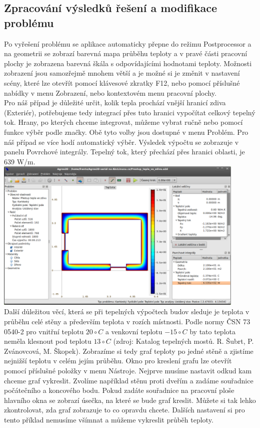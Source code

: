 \documentclass[a4paper, oneside]{article}
\begin{document}
\subsection{Zpracování výsledků řešení a modifikace problému}
Po vyřešení problému se aplikace automaticky přepne do režimu Postprocessor a na geometrii se zobrazí barevná mapa průběhu teploty a v pravé části pracovní plochy je zobrazena barevná škála s odpovídajícími hodnotami teploty. Možnosti zobrazení jsou samozřejmě mnohem větší a je možné si je změnit v nastavení scény, které lze otevřít pomocí klávesové zkratky F12, nebo pomocí příslušné nabídky v menu Zobrazení, nebo kontextovém menu pracovní plochy.\\
Pro náš případ je důležité určit, kolik tepla prochází vnější hranicí zdiva (Exteriér), potřebujeme tedy integrací přes tuto hranici vypočítat celkový tepelný tok. Hrany, po kterých chceme integrovat, můžeme vybrat ručně nebo pomocí funkce výběr podle značky. Obě tyto volby jsou dostupné v menu Problém. Pro náš případ se více hodí automatický výběr. Výsledek výpočtu se zobrazuje v panelu Povrchové integrály. Tepelný tok, který přechází přes hranici oblasti, je 639 W/m.\\
\includegraphics[width=12cm]{Vypocet_tepelneho_toku.eps}\\
Další důležitou věcí, která se při tepelných výpočtech budov sleduje je teplota v průběhu celé stěny a především teplota v rozích místnosti. Podle normy ČSN 73 0540-2 pro vnitřní teplotu $20 \circ C$ a venkovní teplotu $-15 \circ C$ by tato teplota neměla klesnout pod teplotu $13 \circ C$ (zdroj: Katalog tepelných mostů. R. Šubrt, P. Zvánovcová, M. Škopek). Zobrazíme si tedy graf teploty po jedné stěně a zjistíme nejnižší teplotu v celém jejím průběhu. Okno pro kreslení grafu lze otevřít pomocí příslušné položky v menu Nástroje. Nejprve musíme nastavit odkud kam chceme graf vykreslit. Zvolíme například stěnu proti dveřím a zadáme souřadnice počátečního a koncového bodu. Pokud zadáte souřadnice na pracovní ploše hlavního okna se zobrazí úsečka, na které se bude graf kreslit. Můžete si tak lehko zkontrolovat, zda graf zobrazuje to co opravdu chcete. Dalších nastavení si pro tento příklad nemusíme všímnat a můžeme vykreslit průběh teploty.\\
\end{document}
